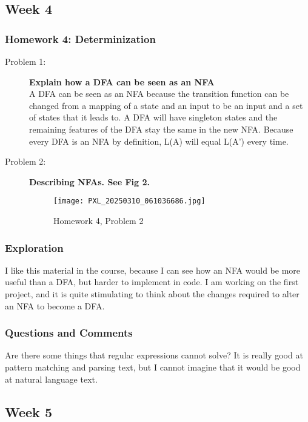 \documentclass{article}
\theoremstyle{theorem}
\theoremstyle{definition}
\theoremstyle{remark}
\begin{document}
\subsection{Week 4}
\subsubsection{Homework 4: Determinization}
\begin{description}
\item[Problem 1: ] \textbf{Explain how a DFA can be seen as an NFA}\\

A DFA can be seen as an NFA because the transition function can be changed from a mapping of a state and an input to be an input and a set of states that it leads to. A DFA will have singleton states and the remaining features of the DFA stay the same in the new NFA. Because every DFA is an NFA by definition, L(A) will equal L(A') every time.

\item[Problem 2: ] \textbf{Describing NFAs. See Fig 2.}\\
\begin{figure}
    \centering
    \texttt{[image: PXL\_20250310\_061036686.jpg]}
    \caption{Homework 4, Problem 2}
    \label{fig:enter-label}
\end{figure}
\end{description}

\subsubsection{Exploration}
I like this material in the course, because I can see how an NFA would be more useful than a DFA, but harder to implement in code. I am working on the first project, and it is quite stimulating to think about the changes required to alter an NFA to become a DFA.

\subsubsection{Questions and Comments}
Are there some things that regular expressions cannot solve? It is really good at pattern matching and parsing text, but I cannot imagine that it would be good at natural language text.

\subsection{Week 5}
\end{document}
